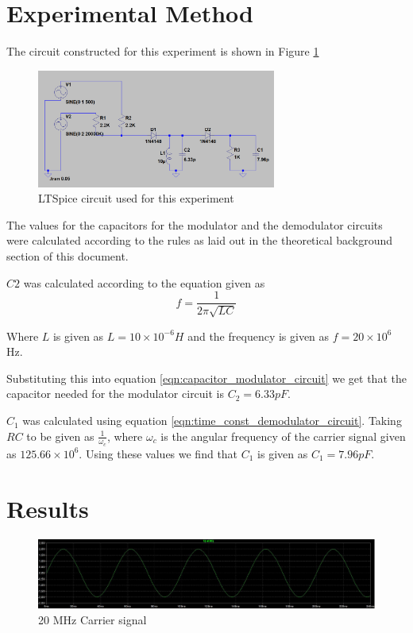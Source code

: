 \documentclass[12pt, a4paper]{article}
\begin{document}
\section{Experimental Method} %
\label{sec:experimental_method}
	The circuit constructed for this experiment is shown in Figure \ref{fig:circuit_1}
	\begin{figure}[H]
		\centering
		\label{fig:circuit_1}
		\includegraphics[width=0.7\textwidth]{images/circuit_1.png}
		\caption{LTSpice circuit used for this experiment}
	\end{figure}

	The values for the capacitors for the modulator and the demodulator circuits were calculated according to the rules as laid out in the theoretical background section of this document.

	$C2$ was calculated according to the equation given as 
	\begin{equation}
		\label{eqn:capacitor_modulator_circuit}
				f =  \frac{1}{2\pi\sqrt{LC}} 
	\end{equation}

	Where $L$ is given as $L = 10\times10^{-6}H$ and the frequency is given as $f= 20\times 10^6 $Hz.

	Substituting this into equation \ref{eqn:capacitor_modulator_circuit} we get that the capacitor needed for the modulator circuit is $C_2 = 6.33pF$.

	$C_1$ was calculated using equation \ref{eqn:time_const_demodulator_circuit}. Taking $RC$ to be given as $\frac{1}{\omega_c}$, where $\omega_c$ is the angular frequency of the carrier signal given as $125.66 \times 10^6 $. Using these values we find that $C_1$ is given as $C_1 = 7.96 pF$.



\section{Results} %
\label{sec:results}
	\begin{figure}[H]
		\centering
		\includegraphics[width=.8\textwidth]{images/carrier.JPG}
		\caption{20 MHz Carrier signal}
		\label{fig:carrier}
	\end{figure}
\end{document}
